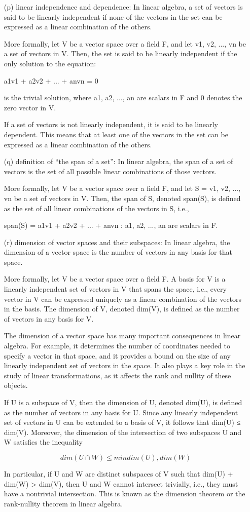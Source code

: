 \documentclass[fontsize=12pt]{scrartcl}
\begin{document}
\begin{itemize}
    \item[(p)] linear independence and dependence: In linear algebra, a set of vectors is said to be linearly independent if none of the vectors in the set can be expressed as a linear combination of the others.

More formally, let V be a vector space over a field F, and let {v1, v2, ..., vn} be a set of vectors in V. Then, the set is said to be linearly independent if the only solution to the equation:

a1v1 + a2v2 + ... + anvn = 0

is the trivial solution, where a1, a2, ..., an are scalars in F and 0 denotes the zero vector in V.

If a set of vectors is not linearly independent, it is said to be linearly dependent. This means that at least one of the vectors in the set can be expressed as a linear combination of the others.
    \item[(q)] definition of ``the span of a set'': In linear algebra, the span of a set of vectors is the set of all possible linear combinations of those vectors.

More formally, let V be a vector space over a field F, and let S = {v1, v2, ..., vn} be a set of vectors in V. Then, the span of S, denoted span(S), is defined as the set of all linear combinations of the vectors in S, i.e.,

span(S) = {a1v1 + a2v2 + ... + anvn : a1, a2, ..., an are scalars in F}.
    \item[(r)] dimension of vector spaces and their subspaces: In linear algebra, the dimension of a vector space is the number of vectors in any basis for that space.

More formally, let V be a vector space over a field F. A basis for V is a linearly independent set of vectors in V that spans the space, i.e., every vector in V can be expressed uniquely as a linear combination of the vectors in the basis. The dimension of V, denoted dim(V), is defined as the number of vectors in any basis for V.

The dimension of a vector space has many important consequences in linear algebra. For example, it determines the number of coordinates needed to specify a vector in that space, and it provides a bound on the size of any linearly independent set of vectors in the space. It also plays a key role in the study of linear transformations, as it affects the rank and nullity of these objects.

If U is a subspace of V, then the dimension of U, denoted dim(U), is defined as the number of vectors in any basis for U. Since any linearly independent set of vectors in U can be extended to a basis of V, it follows that dim(U) ≤ dim(V). Moreover, the dimension of the intersection of two subspaces U and W satisfies the inequality

$$dim(U ∩ W) \leq min{dim(U), dim(W)}$$

In particular, if U and W are distinct subspaces of V such that dim(U) + dim(W) > dim(V), then U and W cannot intersect trivially, i.e., they must have a nontrivial intersection. This is known as the dimension theorem or the rank-nullity theorem in linear algebra.
\end{itemize}
\end{document}
